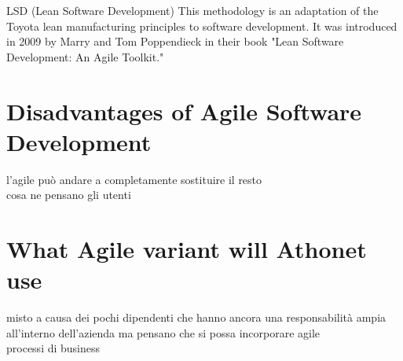 


LSD (Lean Software Development)
This methodology is an adaptation of the Toyota lean manufacturing principles to software development. It was introduced in 2009 by Marry and Tom Poppendieck in their book "Lean Software Development: An Agile Toolkit."


\section{Disadvantages of Agile Software Development}
	l'agile può andare a completamente sostituire il resto\\
	cosa ne pensano gli utenti

\section{What Agile variant will Athonet use}
	misto a causa dei pochi dipendenti che hanno ancora una responsabilità ampia all'interno dell'azienda ma pensano che si possa incorporare agile\\
	processi di business

